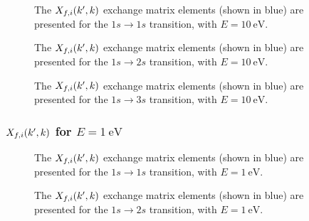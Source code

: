 \documentclass{article}
\begin{document}
\begin{figure}[h]
  \begin{center}
    
  \end{center}
  \caption[Exchange Matrix Elements 1s-1s]{
    The $X_{f, i}(k', k)$ exchange matrix elements (shown in blue) are
    presented for the $1s \to 1s$ transition, with $E = \SI{10}{\eV}$.
  }
  \label{fig:exc-me-1s-1s}
\end{figure}

\begin{figure}[h]
  \begin{center}
    
  \end{center}
  \caption[Exchange Matrix Elements 1s-2s]{
    The $X_{f, i}(k', k)$ exchange matrix elements (shown in blue) are
    presented for the $1s \to 2s$ transition, with $E = \SI{10}{\eV}$.
  }
  \label{fig:exc-me-1s-2s}
\end{figure}

\begin{figure}[h]
  \begin{center}
    
  \end{center}
  \caption[Exchange Matrix Elements 1s-3s]{
    The $X_{f, i}(k', k)$ exchange matrix elements (shown in blue) are
    presented for the $1s \to 3s$ transition, with $E = \SI{10}{\eV}$.
  }
  \label{fig:exc-me-1s-3s}
\end{figure}

\clearpage

\subsubsection{$X_{f, i}(k', k)$ for $E = \SI{1}{\eV}$}
\label{sec:exc-me-1}

\begin{figure}[h]
  \begin{center}
    
  \end{center}
  \caption[Exchange Matrix Elements 1s-1s]{
    The $X_{f, i}(k', k)$ exchange matrix elements (shown in blue) are
    presented for the $1s \to 1s$ transition, with $E = \SI{1}{\eV}$.
  }
  \label{fig:exc-me-1s-1s}
\end{figure}

\begin{figure}[h]
  \begin{center}
    
  \end{center}
  \caption[Exchange Matrix Elements 1s-2s]{
    The $X_{f, i}(k', k)$ exchange matrix elements (shown in blue) are
    presented for the $1s \to 2s$ transition, with $E = \SI{1}{\eV}$.
  }
  \label{fig:exc-me-1s-2s}
\end{figure}
\end{document}
